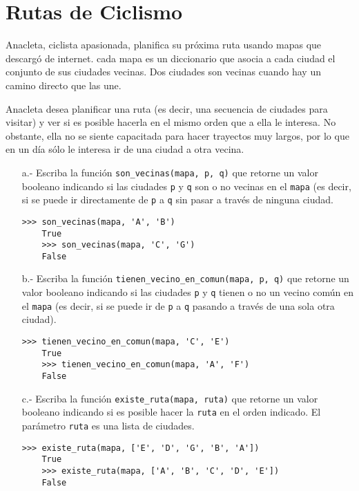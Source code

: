\pagebreak[4]
\section{Rutas de Ciclismo}

  Anacleta, ciclista apasionada,
  planifica su próxima ruta usando mapas
  que descargó de internet.
  cada mapa es un diccionario que asocia
  a cada ciudad el conjunto de sus ciudades vecinas.
  Dos ciudades son vecinas cuando hay un camino directo
  que las une.
  
  \begin{figure}[H]
    \centering
  \end{figure}
  
  Anacleta desea planificar una ruta
  (es decir, una secuencia de ciudades para visitar)
  y ver si es posible hacerla
  en el mismo orden que a ella le interesa.
  No obstante,
  ella no se siente capacitada para hacer
  trayectos muy largos,
  por lo que en un día sólo le interesa
  ir de una ciudad a otra vecina.
  
  \begin{itemize}
  \item[a.-]
    Escriba la función 
    \texttt{son\_vecinas(mapa, p, q)}
    que retorne un valor booleano indicando
    si las ciudades \texttt{p} y \texttt{q}
    son o no vecinas en el \texttt{mapa}
    (es decir,
    si se puede ir directamente de
    \texttt{p} a \texttt{q}
    sin pasar a través de ninguna ciudad.
    \begin{lstlisting}[style=consola]
    >>> son_vecinas(mapa, 'A', 'B')
    True
    >>> son_vecinas(mapa, 'C', 'G')
    False
    \end{lstlisting}
  \item[b.-]
    Escriba la función 
    \texttt{tienen\_vecino\_en\_comun(mapa, p, q)}
    que retorne un valor booleano
    indicando si las ciudades
    \texttt{p} y \texttt{q}
    tienen o no un vecino común
    en el \texttt{mapa}
    (es decir,
    si se puede ir
    de \texttt{p} a \texttt{q}
    pasando a través de una sola otra ciudad).
    \begin{lstlisting}[style=consola]
    >>> tienen_vecino_en_comun(mapa, 'C', 'E')
    True
    >>> tienen_vecino_en_comun(mapa, 'A', 'F')
    False
    \end{lstlisting}
  \item[c.-]
    Escriba la función
    \texttt{existe\_ruta(mapa, ruta)}
    que retorne un valor booleano
    indicando si es posible hacer la
    \texttt{ruta}
    en el orden indicado.
    El parámetro \texttt{ruta}
    es una lista de ciudades.
    \begin{lstlisting}[style=consola]
    >>> existe_ruta(mapa, ['E', 'D', 'G', 'B', 'A'])
    True
    >>> existe_ruta(mapa, ['A', 'B', 'C', 'D', 'E'])
    False
    \end{lstlisting}
  \end{itemize}